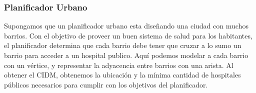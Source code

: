 \subsubsection{Planificador Urbano}

Supongamos que un planificador urbano esta diseñando una ciudad con muchos barrios. Con el objetivo de proveer un buen sistema de salud para los habitantes, el planificador determina que cada barrio debe tener que cruzar a lo sumo un barrio para acceder a un hospital publico. Aquí podemos modelar a cada barrio con un vértice, y representar la adyacencia entre barrios con una arista. Al obtener el CIDM, obtenemos la ubicación y la mínima cantidad de hospitales públicos necesarios para cumplir con los objetivos del planificador.